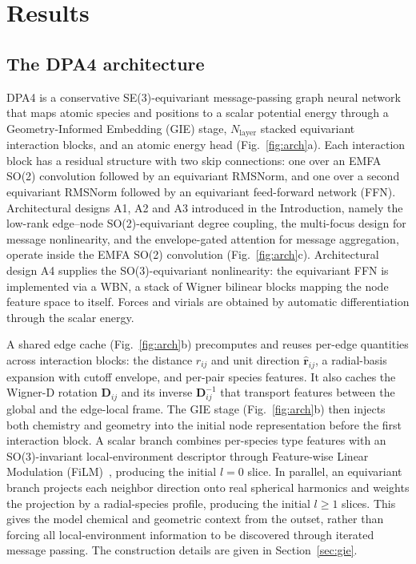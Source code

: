 \section{Results}
\label{sec:results}

\subsection{The DPA4 architecture}
\label{sec:arch_overview}

DPA4 is a conservative SE(3)-equivariant message-passing graph neural network that maps atomic species and positions to a scalar potential energy through a Geometry-Informed Embedding (GIE) stage, $N_{\mathrm{layer}}$ stacked equivariant interaction blocks, and an atomic energy head (Fig.~\ref{fig:arch}a).
Each interaction block has a residual structure with two skip connections: one over an EMFA SO(2) convolution followed by an equivariant RMSNorm, and one over a second equivariant RMSNorm followed by an equivariant feed-forward network (FFN).
Architectural designs A1, A2 and A3 introduced in the Introduction, namely the low-rank edge--node SO(2)-equivariant degree coupling, the multi-focus design for message nonlinearity, and the envelope-gated attention for message aggregation, operate inside the EMFA SO(2) convolution (Fig.~\ref{fig:arch}c).
Architectural design A4 supplies the SO(3)-equivariant nonlinearity: the equivariant FFN is implemented via a WBN, a stack of Wigner bilinear blocks mapping the node feature space to itself.
Forces and virials are obtained by automatic differentiation through the scalar energy.

A shared edge cache (Fig.~\ref{fig:arch}b) precomputes and reuses per-edge quantities across interaction blocks: the distance $r_{ij}$ and unit direction $\widehat{\mathbf{r}}_{ij}$, a radial-basis expansion with cutoff envelope, and per-pair species features.
It also caches the Wigner-D rotation $\mathbf{D}_{ij}$ and its inverse $\mathbf{D}_{ij}^{-1}$ that transport features between the global and the edge-local frame.
The GIE stage (Fig.~\ref{fig:arch}b) then injects both chemistry and geometry into the initial node representation before the first interaction block.
A scalar branch combines per-species type features with an SO(3)-invariant local-environment descriptor through Feature-wise Linear Modulation (FiLM)~\cite{perez2018film}, producing the initial $l=0$ slice.
In parallel, an equivariant branch projects each neighbor direction onto real spherical harmonics and weights the projection by a radial-species profile, producing the initial $l\geq 1$ slices.
This gives the model chemical and geometric context from the outset, rather than forcing all local-environment information to be discovered through iterated message passing.
The construction details are given in Section~\ref{sec:gie}.

